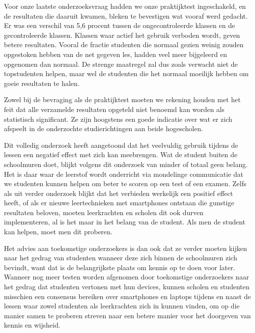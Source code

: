 Voor onze laatste onderzoeksvraag hadden we onze praktijktest ingeschakeld, en de resultaten die daaruit kwamen, bleken te bevestigen wat vooraf werd gedacht. Er was een verschil van 5,6 procent tussen de ongecontroleerde klassen en de gecontroleerde klassen. Klassen waar actief het gebruik verboden wordt, geven betere resultaten. Vooral de fractie studenten die normaal gezien weinig zouden opgestoken hebben van de net gegeven les, hadden veel meer bijgeleerd en opgenomen dan normaal. De strenge maatregel zal dus zoals verwacht niet de topstudenten helpen, maar wel de studenten die het normaal moeilijk hebben om goeie resultaten te halen.

Zowel bij de bevraging als de praktijktest moeten we rekening houden met het feit dat alle verzamelde resultaten opgeteld niet benoemd kan worden als statistisch significant. Ze zijn hoogstens een goede indicatie over wat er zich afspeelt in de onderzochte studierichtingen aan beide hogescholen.

Dit volledig onderzoek heeft aangetoond dat het veelvuldig gebruik tijdens de lessen een negatief effect met zich kan meebrengen. Wat de student buiten de schoolmuren doet, blijkt volgens dit onderzoek van minder of totaal geen belang. Het is daar waar de leerstof wordt onderricht via mondelinge communicatie dat we studenten kunnen helpen om beter te scoren op een test of een examen. Zelfs als uit verder onderzoek blijkt dat het verbieden werkelijk een positief effect heeft, of als er nieuwe leertechnieken met smartphones ontstaan die gunstige resultaten beloven, moeten leerkrachten en scholen dit ook durven implementeren, al is het maar in het belang van de student. Als men de student kan helpen, moet men dit proberen. 

Het advies aan toekomstige onderzoekers is dan ook dat ze verder moeten kijken naar het gedrag van studenten wanneer deze zich binnen de schoolmuren zich bevindt, want dat is de belangrijkste plaats om kennis op te doen voor later. Wanneer nog meer testen worden afgenomen door toekomstige onderzoekers naar het gedrag dat studenten vertonen met hun devices, kunnen scholen en studenten misschien een consensus bereiken over smartphones en laptops tijdens en naast de lessen waar zowel studenten als leerkrachten zich in kunnen vinden, om op die manier samen te proberen streven naar een betere manier voor het doorgeven van kennis en wijsheid.